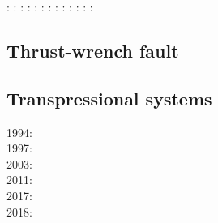 \begin{scriptsize}
\nineteeneightythree: \cite{stoc83}\cite{dasd83}
\nineteeneightyfour: \cite{dahl84}\cite{dasd84}
\nineteenninety: \cite{dahl90}
\nineteenninetyfour: \cite{koon94}
\twothousandthree: \cite{wiep03}\cite{smbs03}\cite{muso03}\cite{vamf03}
\twothousandsix: \cite{simp06}\cite{yabm06}
\twothousandtwelve: \cite{rukb12}
\twothousandthirteen: \cite{rugb13}
\twothousandsixteen: \cite{mauw16}
\twothousandseventeen: \cite{mauw17}\cite{rugb17}
\twothousandeighteen: \cite{weib18}
\twothousandnineteen: \cite{elgb19}\cite{meho19}\cite{meho19b}
\twothousandtwenty: \cite{spsk20}\cite{kids20}
\end{scriptsize}

\subsection{Thrust-wrench fault} 

\cite{rods15}

\subsection{Transpressional systems} 

\begin{scriptsize}
1994: \cite{tite94}\\
1997: \cite{thsj97}\\
2003: \cite{konc03}\cite{upke03}\\
2011: \cite{legs11}\\
2017: \cite{naam17}\cite{rugb17}\\
2018: \cite{naam18}
\end{scriptsize}

